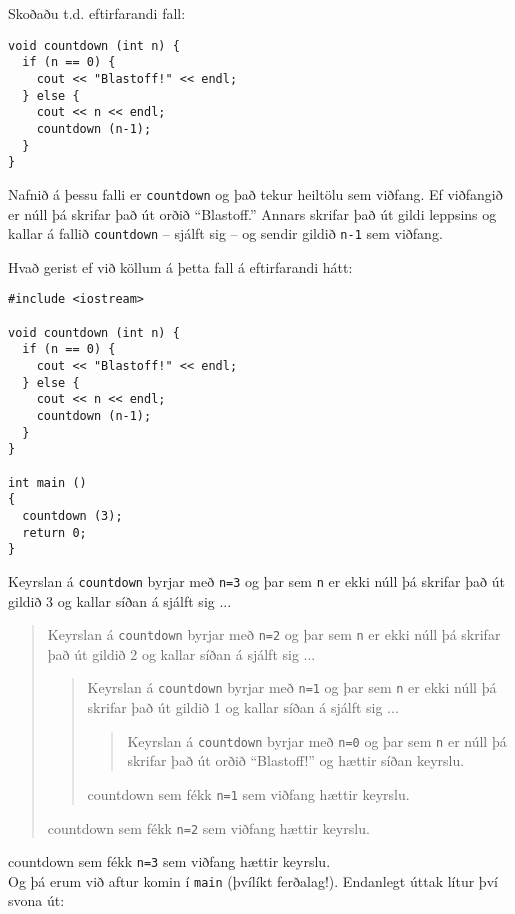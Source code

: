 Skoðaðu t.d. eftirfarandi fall:

\begin{verbatim}
void countdown (int n) {
  if (n == 0) {
    cout << "Blastoff!" << endl;
  } else {
    cout << n << endl;
    countdown (n-1);
  }
}
\end{verbatim}
%
Nafnið á þessu falli er {\tt countdown} og það tekur heiltölu sem viðfang.
Ef viðfangið er núll þá skrifar það út orðið ``Blastoff.''
Annars skrifar það út gildi leppsins og kallar á fallið {\tt countdown} -- sjálft sig -- og sendir gildið {\tt n-1} sem viðfang.

Hvað gerist ef við köllum á þetta fall á eftirfarandi hátt:

\begin{verbatim}
#include <iostream>

void countdown (int n) {
  if (n == 0) {
    cout << "Blastoff!" << endl;
  } else {
    cout << n << endl;
    countdown (n-1);
  }
}

int main ()
{
  countdown (3);
  return 0;
}
\end{verbatim}
%
Keyrslan á {\tt countdown} byrjar með {\tt n=3} og þar sem {\tt n} er ekki núll
þá skrifar það út gildið 3 og kallar síðan á sjálft sig ...

\begin{quote}
Keyrslan á {\tt countdown} byrjar með {\tt n=2} og þar sem {\tt n} er ekki núll
þá skrifar það út gildið 2 og kallar síðan á sjálft sig ...

\begin{quote}
Keyrslan á {\tt countdown} byrjar með {\tt n=1} og þar sem {\tt n} er ekki núll
þá skrifar það út gildið 1 og kallar síðan á sjálft sig ...

\begin{quote}
Keyrslan á {\tt countdown} byrjar með {\tt n=0} og þar sem {\tt n} er núll
þá skrifar það út orðið ``Blastoff!'' og hættir síðan keyrslu.
\end{quote}

countdown sem fékk {\tt n=1} sem viðfang hættir keyrslu.

\end{quote}

countdown sem fékk {\tt n=2} sem viðfang hættir keyrslu.

\end{quote}

countdown sem fékk {\tt n=3} sem viðfang hættir keyrslu.\\

\noindent Og þá erum við aftur komin í {\tt main} (þvílíkt ferðalag!).
Endanlegt úttak lítur því svona út:

